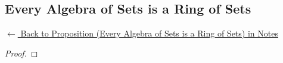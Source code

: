 
\subsection*{Every Algebra of Sets is a Ring of Sets}
\label{prf:algebra-is-ring}

\begin{remark*}[Return]
\hyperref[prop:algebra-is-ring]{$\leftarrow$ Back to Proposition (Every Algebra of Sets is a Ring of Sets) in Notes}
\end{remark*}

\begin{proof}
\end{proof}

\begin{remark*}

\end{remark*}

\begin{remark*}[Dependencies]

\FlashUses{}
\end{remark*}
